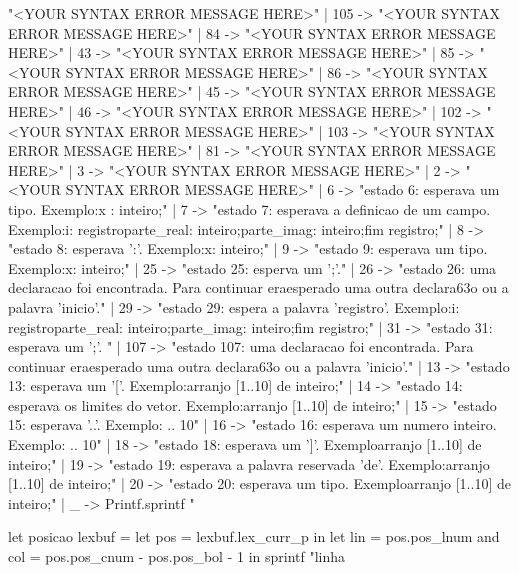\documentclass[12pt,a4paper,twoside]{article}
\begin{document}
\begin{terminal}
        "<YOUR SYNTAX ERROR MESSAGE HERE>\n"
    | 105 ->
        "<YOUR SYNTAX ERROR MESSAGE HERE>\n"
    | 84 ->
        "<YOUR SYNTAX ERROR MESSAGE HERE>\n"
    | 43 ->
        "<YOUR SYNTAX ERROR MESSAGE HERE>\n"
    | 85 ->
        "<YOUR SYNTAX ERROR MESSAGE HERE>\n"
    | 86 ->
        "<YOUR SYNTAX ERROR MESSAGE HERE>\n"
    | 45 ->
        "<YOUR SYNTAX ERROR MESSAGE HERE>\n"
    | 46 ->
        "<YOUR SYNTAX ERROR MESSAGE HERE>\n"
    | 102 ->
        "<YOUR SYNTAX ERROR MESSAGE HERE>\n"
    | 103 ->
        "<YOUR SYNTAX ERROR MESSAGE HERE>\n"
    | 81 ->
        "<YOUR SYNTAX ERROR MESSAGE HERE>\n"
    | 3 ->
        "<YOUR SYNTAX ERROR MESSAGE HERE>\n"
    | 2 ->
        "<YOUR SYNTAX ERROR MESSAGE HERE>\n"
    | 6 ->
        "estado 6: esperava um tipo. Exemplo:\n   x : inteiro;\n"
    | 7 ->
        "estado 7: esperava a definicao de um campo. Exemplo:\n   i: registro\n         parte_real: inteiro;\n         parte_imag: inteiro;\n      fim registro;\n      "
    | 8 ->
        "estado 8: esperava ':'. Exemplo:\n   x: inteiro;\n   "
    | 9 ->
        "estado 9: esperava um tipo. Exemplo:\n   x: inteiro;\n"
    | 25 ->
        "estado 25: esperva um ';'.\n"
    | 26 ->
        "estado 26: uma declaracao foi encontrada. Para continuar era\n   esperado uma outra declara\163o ou a palavra 'inicio'.\n"
    | 29 ->
        "estado 29: espera a palavra 'registro'. Exemplo:\n   i: registro\n         parte_real: inteiro;\n         parte_imag: inteiro;\n      fim registro;\n"
    | 31 ->
        "estado 31: esperava um ';'. \n"
    | 107 ->
        "estado 107: uma declaracao foi encontrada. Para continuar era\n   esperado uma outra declara\163o ou a palavra 'inicio'.\n"
    | 13 ->
        "estado 13: esperava um '['. Exemplo:\n   arranjo [1..10] de inteiro;\n"
    | 14 ->
        "estado 14: esperava os limites do vetor. Exemplo:\n   arranjo [1..10] de inteiro;\n"
    | 15 ->
        "estado 15: esperava '..'. Exemplo: .. 10\n"
    | 16 ->
        "estado 16: esperava um numero inteiro. Exemplo: .. 10\n"
    | 18 ->
        "estado 18: esperava um ']'. Exemplo\n   arranjo [1..10] de inteiro;\n"
    | 19 ->
        "estado 19: esperava a palavra reservada 'de'. Exemplo:\n   arranjo [1..10] de inteiro;\n"
    | 20 ->
        "estado 20: esperava um tipo. Exemplo\n   arranjo [1..10] de inteiro;\n"
    | _ ->
        Printf.sprintf "%

let posicao lexbuf =
    let pos = lexbuf.lex_curr_p in
    let lin = pos.pos_lnum
    and col = pos.pos_cnum - pos.pos_bol - 1 in
    sprintf "linha %


\end{terminal}
\end{document}
